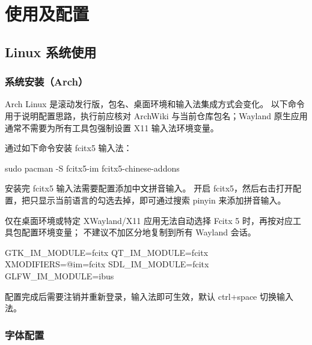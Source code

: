 \chapter{使用及配置}

\section{Linux 系统使用}

\subsection{系统安装（Arch）}

Arch Linux 是滚动发行版，包名、桌面环境和输入法集成方式会变化。
以下命令用于说明配置思路，执行前应核对 ArchWiki 与当前仓库包名；Wayland 原生应用通常不需要为所有工具包强制设置 X11 输入法环境变量。


通过如下命令安装 fcitx5 输入法：

\begin{lstcode}[numbers=none]
  sudo pacman -S fcitx5-im fcitx5-chinese-addons
\end{lstcode}

安装完 fcitx5 输入法需要配置添加中文拼音输入。
开启 fcitx5，然后右击打开配置，把只显示当前语言的勾选去掉，即可通过搜索 pinyin 来添加拼音输入。


仅在桌面环境或特定 XWayland/X11 应用无法自动选择 Fcitx 5 时，再按对应工具包配置环境变量；
不建议不加区分地复制到所有 Wayland 会话。

\begin{lstcode}[numbers=none]
  GTK_IM_MODULE=fcitx
  QT_IM_MODULE=fcitx
  XMODIFIERS=@im=fcitx
  SDL_IM_MODULE=fcitx
  GLFW_IM_MODULE=ibus
\end{lstcode}

配置完成后需要注销并重新登录，输入法即可生效，默认 ctrl+space 切换输入法。

\subsection{字体配置}

